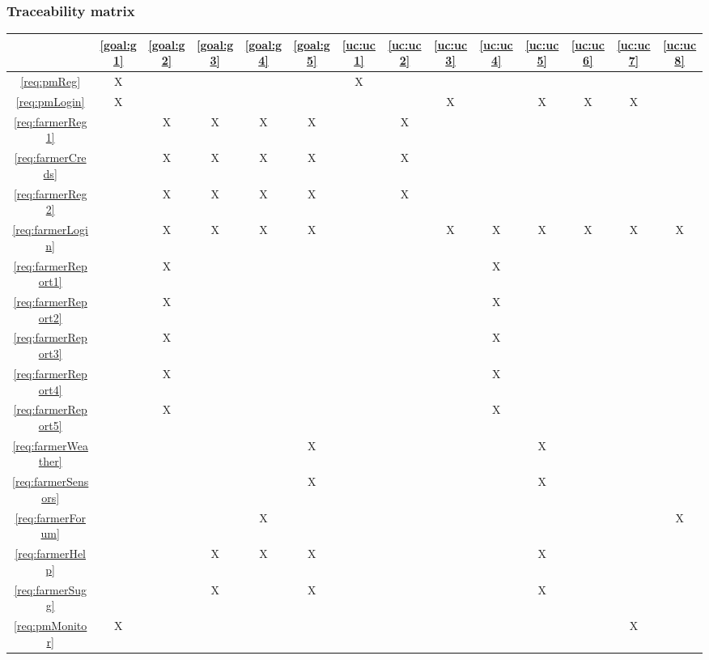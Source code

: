 \documentclass[10pt]{article}
\begin{document}
\subsubsection{Traceability matrix}
\begin{table}[h!]
    \begin{center}
    \begin{adjustbox}{width=\columnwidth,center}
    \begin{tabular}{|c|ccccc|cccccccc|}
    \hline
        & \ref{goal:g1} & \ref{goal:g2} & \ref{goal:g3} & \ref{goal:g4} & \ref{goal:g5} & \ref{uc:uc1} & \ref{uc:uc2} & \ref{uc:uc3} & \ref{uc:uc4} & \ref{uc:uc5} & \ref{uc:uc6} & \ref{uc:uc7} & \ref{uc:uc8} \\ \hline
    \ref{req:pmReg}  & X &  &  &  &  & X &  &  &  &  &  &  &  \\
    \ref{req:pmLogin}  & X &  &  &  &  &  &  & X &  & X & X & X &  \\
    \ref{req:farmerReg1}  &  & X & X & X & X &  & X &  &  &  &  &  &  \\
    \ref{req:farmerCreds}  &  & X & X & X & X &  & X &  &  &  &  &  &  \\
    \ref{req:farmerReg2}  &  & X & X & X & X &  & X &  &  &  &  &  &  \\
    \ref{req:farmerLogin}  &  & X & X & X & X &  &  & X & X & X & X & X & X \\
    \ref{req:farmerReport1}  &  & X &  &  &  &  &  &  & X &  &  &  &  \\
    \ref{req:farmerReport2}  &  & X &  &  &  &  &  &  & X &  &  &  &  \\
    \ref{req:farmerReport3}  &  & X &  &  &  &  &  &  & X &  &  &  &  \\
    \ref{req:farmerReport4}  &  & X &  &  &  &  &  &  & X &  &  &  &  \\
    \ref{req:farmerReport5}  &  & X &  &  &  &  &  &  & X &  &  &  &  \\
    \ref{req:farmerWeather}  &  &  &  &  & X &  &  &  &  & X &  &  &  \\
    \ref{req:farmerSensors}  &  &  &  &  & X &  &  &  &  & X &  &  &  \\
    \ref{req:farmerForum}  &  &  &  & X &  &  &  &  &  &  &  &  & X \\
    \ref{req:farmerHelp}  &  &  & X & X & X &  &  &  &  & X &  &  &  \\
    \ref{req:farmerSugg}  &  &  & X &  & X &  &  &  &  & X &  &  &  \\
    \ref{req:pmMonitor}  & X &  &  &  &  &  &  &  &  &  &  & X &  \\

\end{tabular}
\end{adjustbox}
\end{center}
\end{table}
\end{document}
